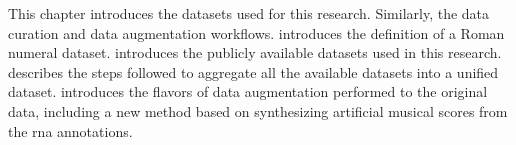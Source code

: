 
This chapter introduces the datasets used for this
research. Similarly, the data curation and data augmentation
workflows.  introduces the
definition of a Roman numeral dataset.
 introduces the publicly available
datasets used in this research.
 describes the steps
followed to aggregate all the available datasets into a
unified dataset.  introduces the
flavors of data augmentation performed to the original data,
including a new method based on synthesizing artificial
musical scores from the \gls{rna} annotations.
